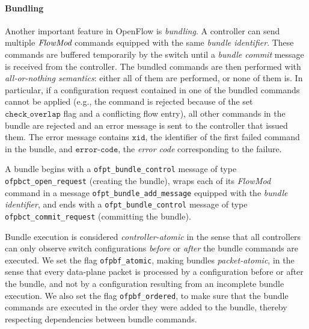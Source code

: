 \documentclass[conference]{sigcomm-alternate}
\newcommand{\FlowMod}{\emph{FlowMod}\xspace}
\newcommand{\checko}{\texttt{check\_overlap}\xspace}
\newcommand{\liron}[1]{\textit{\textcolor{mygreen}{[liron]: #1}}} %
\newcommand{\xid}{\texttt{xid}}
\newcommand{\ecode}{\texttt{error-code}}
\begin{document}
\paragraph{Bundling}

Another important feature in OpenFlow is \emph{bundling}. 
A controller can send multiple $\FlowMod$ commands  equipped with 
the same \emph{bundle identifier}.
These commands are buffered temporarily by
the switch until a \emph{bundle commit} message is received from the
controller. 
The bundled commands are then performed with \emph{all-or-nothing semantics}:
either all of them are performed, or none of them is. 
In particular, if a configuration request contained in one of the bundled commands cannot
be applied (e.g., the command is rejected because of the set
$\checko$ flag and a conflicting flow entry), all  other commands in
the bundle are rejected and an error
message is sent to the controller that issued them.
The error message contains $\xid$, the identifier of the first failed command in the
bundle, and $\ecode$, the \emph{error code} corresponding to the failure.   

A bundle begins with a  \texttt{ofpt\_bundle\_control} message of type
\texttt{ofpbct\_open\_request} (creating the bundle), wraps
each of its \emph{FlowMod} command in a message  
\texttt{ofpt\_bundle\_add\_message} equipped with the \emph{bundle
  identifier}, and ends with a \texttt{ofpt\_bundle\_control} message of
type \texttt{ofpbct\_commit\_request} (committing the bundle). 




Bundle execution is considered \emph{controller-atomic} 
in the sense that all controllers can only observe switch 
configurations \emph{before} or \emph{after} the
bundle commands are executed. 
We set the flag \texttt{ofpbf\_atomic},  
making bundles \emph{packet-atomic}, 
in the sense that every data-plane packet is processed by a configuration
before or after the bundle, and not by a configuration resulting from
an incomplete bundle execution.
We also set the flag \texttt{ofpbf\_ordered},  to make sure that the 
bundle commands are executed in the order they were added to the
bundle, thereby respecting dependencies between bundle commands.
\end{document}
